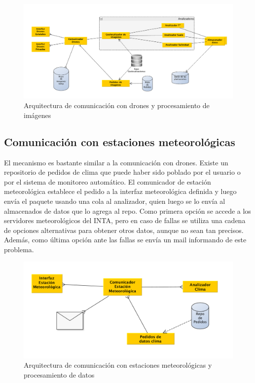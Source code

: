 \begin{figure}[h!]
  \centering
  \includegraphics[width=1\textwidth]{./images/arq_drones.png}
  \caption{Arquitectura de comunicación con drones y procesamiento de imágenes}
  \label{fig:clases4}
\end{figure}

\subsection{Comunicación con estaciones meteorológicas}

El mecanismo es bastante similar a la comunicación con drones. Existe un repositorio de pedidos de clima que puede haber sido poblado por el usuario o por el sistema de monitoreo automático. El comunicador de estación meteorológica establece el pedido a la interfaz meteorológica definida y luego envía el paquete usando una cola al analizador, quien luego se lo envía al almacenados de datos que lo agrega al repo. Como primera opción se accede a los servidores meteorológicos del INTA, pero en caso de fallas se utiliza una cadena de opciones alternativas para obtener otros datos, aunque no sean tan precisos. Además, como última opción ante las fallas se envía un mail informando de este problema.

\begin{figure}[h!]
  \centering
  \includegraphics[width=1\textwidth]{./images/arq_clima.png}
  \caption{Arquitectura de comunicación con estaciones meteorológicas y procesamiento de datos}
  \label{fig:clases4}
\end{figure}



